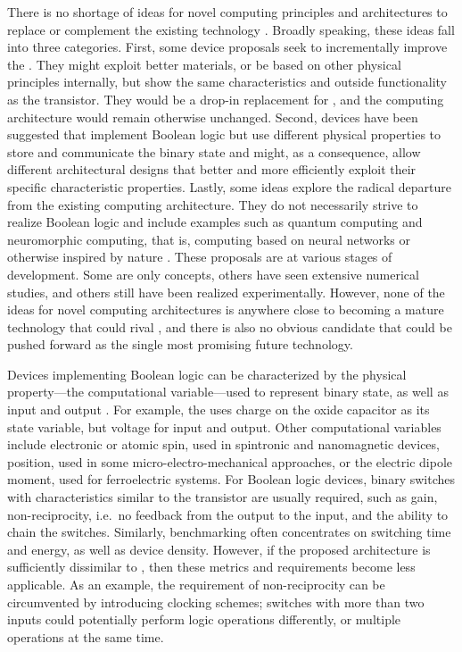 There is no shortage of ideas for novel computing principles and architectures
to replace or complement the existing technology \cite{cavin2012science,
bernstein2010device}. Broadly speaking, these ideas fall into three categories.
First, some device proposals seek to incrementally improve the .
They might exploit better materials, or be based on other physical principles
internally, but show the same characteristics and outside functionality as the
transistor. They would be a drop-in replacement for , and the
computing architecture would remain otherwise unchanged. Second, devices have
been suggested that implement Boolean logic but use different physical
properties to store and communicate the binary state and might, as a
consequence, allow different architectural designs that better and more
efficiently exploit their specific characteristic properties. Lastly, some ideas
explore the radical departure from the existing computing architecture. They do
not necessarily strive to realize Boolean logic and include examples such as
quantum computing and neuromorphic computing, that is, computing based on neural
networks or otherwise inspired by nature \cite{mead1990neuromorphic,
schemmel2010wafer, furber2012overview}. These proposals are at various stages of
development. Some are only concepts, others have seen extensive numerical
studies, and others still have been realized experimentally. However, none of
the ideas for novel computing architectures is anywhere close to becoming a
mature technology that could rival , and there is also no obvious
candidate that could be pushed forward as the single most promising future
technology.

Devices implementing Boolean logic can be characterized by the physical
property---the computational variable---used to represent binary state, as well
as input and output \cite{nikonov2013overview}. For example, the  uses
charge on the oxide capacitor as its state variable, but voltage for input and
output. Other computational variables include electronic or atomic spin, used in
spintronic and nanomagnetic devices, position, used in some
micro-electro-mechanical approaches, or the electric dipole moment, used for
ferroelectric systems. For Boolean logic devices, binary switches with
characteristics similar to the transistor are usually required, such as gain,
non-reciprocity, i.e.~no feedback from the output to the input, and the ability
to chain the switches. Similarly, benchmarking often concentrates on switching
time and energy, as well as device density. However, if the proposed
architecture is sufficiently dissimilar to , then these metrics and
requirements become less applicable. As an example, the requirement of
non-reciprocity can be circumvented by introducing clocking schemes; switches
with more than two inputs could potentially perform logic operations
differently, or multiple operations at the same time.

